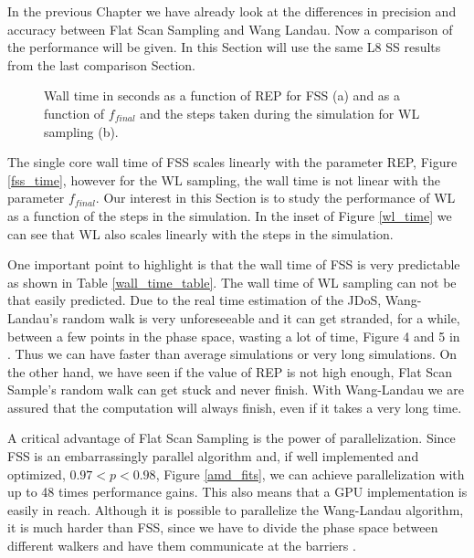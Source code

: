 	In the previous Chapter we have already look at the differences in precision and accuracy between Flat Scan Sampling and Wang Landau. Now a comparison of the performance will be given. In this Section will use the same L8 SS results from the last comparison Section.
		
\begin{figure}[h]
	\centering
	\caption{Wall time in seconds as a function of REP for FSS (a) and as a function of $f_{final}$ and the steps taken during the simulation for WL sampling (b).}
\end{figure}

	The single core wall time of FSS scales linearly with the parameter REP, Figure \ref{fss_time}, however for the WL sampling, the wall time is not linear with the parameter $f_{final}$. Our interest in this Section is to study the performance of WL as a function of the steps in the simulation. In the inset of Figure \ref{wl_time} we can see that WL also scales linearly with the steps in the simulation.
	
	One important point to highlight is that the wall time of FSS is very predictable as shown in Table \ref{wall_time_table}. The wall time of WL sampling can not be that easily predicted. Due to the real time estimation of the JDoS, Wang-Landau's random walk is very unforeseeable and it can get stranded, for a while, between a few points in the phase space, wasting a lot of time, Figure 4 and 5 in \cite{Nguyen2006}. Thus we can have faster than average simulations or very long simulations. 
	On the other hand, we have seen if the value of REP is not high enough, Flat Scan Sample's random walk can get stuck and never finish. With Wang-Landau we are assured that the computation will always finish, even if it takes a very long time.

	A critical advantage of Flat Scan Sampling is the power of parallelization. Since FSS is an embarrassingly parallel algorithm and, if well implemented and optimized, $0.97<p<0.98$, Figure \ref{amd_fits}, we can achieve parallelization with up to 48 times performance gains. This also means that a GPU implementation is easily in reach. Although it is possible to parallelize the Wang-Landau algorithm, it is much harder than FSS, since we have to divide the phase space between different walkers and have them communicate at the barriers \cite{Yin2012}.


